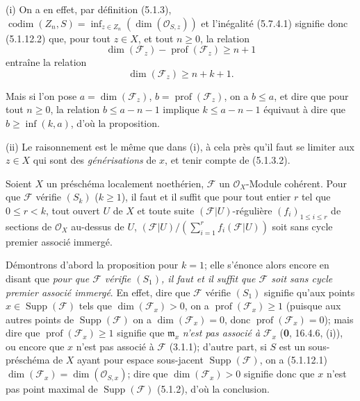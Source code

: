 (i) On a en effet, par définition (5.1.3),
$\operatorname{codim}(Z_n,S)=\inf_{z\in Z_n}(\dim(\mathcal O_{S,z}))$ et
l'inégalité (5.7.4.1) signifie donc (5.1.12.2) que, pour tout $z\in X$, et
tout $n\geq0$, la relation
\[
\dim(\mathscr F_z)-\operatorname{prof}(\mathscr F_z)\geq n+1
\]
entraîne la relation
\[
\dim(\mathscr F_z)\geq n+k+1.
\]

Mais si l'on pose $a=\dim(\mathscr F_z)$,
$b=\operatorname{prof}(\mathscr F_z)$, on a $b\leq a$, et dire que pour tout
$n\geq0$, la relation $b\leq a-n-1$ implique $k\leq a-n-1$ équivaut à dire
que $b\geq\inf(k,a)$, d'où la proposition.


(ii) Le raisonnement est le même que dans (i), à cela près qu'il faut se
limiter aux $z\in X$ qui sont des \emph{générisations} de $x$, et tenir compte de
(5.1.3.2).

\begin{proposition}[5.7.5]
\label{IV.2.s5.7.5-fr}
Soient $X$ un préschéma localement noethérien, $\mathscr F$ un
$\mathcal O_X$-Module cohérent. Pour que $\mathscr F$ vérifie $(S_k)$
($k\geq1$), il faut et il suffit que pour tout entier $r$ tel que
$0\leq r<k$, tout ouvert $U$ de $X$ et toute suite
$(\mathscr F|U)$-régulière $(f_i)_{1\leq i\leq r}$ de sections de
$\mathcal O_X$ au-dessus de $U$,
$(\mathscr F|U)/(\sum_{i=1}^r f_i(\mathscr F|U))$
soit sans cycle premier associé immergé.
\end{proposition}

Démontrons d'abord la proposition pour $k=1$; elle s'énonce alors encore en
disant que \emph{pour que $\mathscr F$ vérifie $(S_1)$, il faut et il suffit que
$\mathscr F$ soit sans cycle premier associé immergé}. En effet, dire que
$\mathscr F$ vérifie $(S_1)$ signifie qu'aux points
$x\in\operatorname{Supp}(\mathscr F)$ tels que $\dim(\mathscr F_x)>0$, on a
$\operatorname{prof}(\mathscr F_x)\geq1$ (puisque aux autres points de
$\operatorname{Supp}(\mathscr F)$ on a $\dim(\mathscr F_x)=0$, donc
$\operatorname{prof}(\mathscr F_x)=0$); mais dire que
$\operatorname{prof}(\mathscr F_x)\geq1$ signifie que $\mathfrak m_x$
\emph{n'est pas associé à} $\mathscr F_x$ (\textbf{0}, 16.4.6, (i)), ou encore que $x$
n'est pas associé à $\mathscr F$ (3.1.1); d'autre part, si $S$ est un
sous-préschéma de $X$ ayant pour espace sous-jacent
$\operatorname{Supp}(\mathscr F)$, on a (5.1.12.1)
$\dim(\mathscr F_x)=\dim(\mathcal O_{S,x})$; dire que
$\dim(\mathscr F_x)>0$ signifie donc que $x$ n'est pas point maximal de
$\operatorname{Supp}(\mathscr F)$ (5.1.2), d'où la conclusion.

